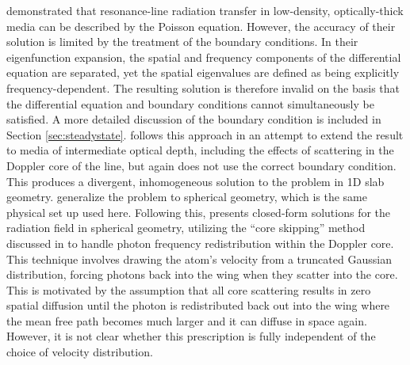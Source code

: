 \documentclass{aastex63}
\begin{document}
\citet{1973MNRAS.162...43H, 1974MNRAS.166..373H} demonstrated that resonance-line radiation transfer in low-density, optically-thick media can be described by the Poisson equation. However, the accuracy of their solution is limited by the treatment of the boundary conditions. In their eigenfunction expansion, the spatial and frequency components of the differential equation are separated, yet the spatial eigenvalues are defined as being explicitly frequency-dependent. The resulting solution is therefore invalid on the basis that the differential equation and boundary conditions cannot simultaneously be satisfied. A more detailed discussion of the boundary condition is included in Section \ref{sec:steadystate}. \citet{1990ApJ...350..216N} follows this approach in an attempt to extend the result to media of intermediate optical depth, including the effects of scattering in the Doppler core of the line, but again does not use the correct boundary condition. This produces a divergent, inhomogeneous solution to the problem in 1D slab geometry. \citet{2006ApJ...649...14D} generalize the problem to spherical geometry, which is the same physical set up used here. Following this, \citet{2020arXiv200509692L} presents closed-form solutions for the radiation field in spherical geometry, utilizing the ``core skipping'' method discussed in \citet{2015MNRAS.449.4336S} to handle photon frequency redistribution within the Doppler core. This technique involves drawing the atom's velocity from a truncated Gaussian distribution, forcing photons back into the wing when they scatter into the core. This is motivated by the assumption that all core scattering results in zero spatial diffusion until the photon is redistributed back out into the wing where the mean free path becomes much larger and it can diffuse in space again. However, it is not clear whether this prescription is fully independent of the choice of velocity distribution.
\end{document}
